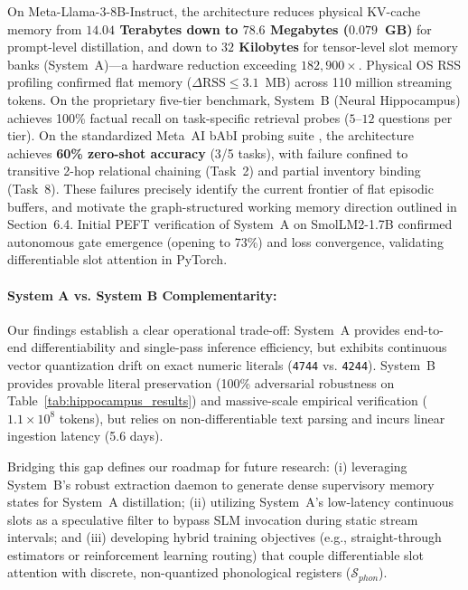 \documentclass[11pt,a4paper]{article}
\begin{document}
On Meta-Llama-3-8B-Instruct, the architecture reduces physical KV-cache memory from \textbf{$14.04$ Terabytes down to $78.6$ Megabytes ($0.079$~GB)} for prompt-level distillation, and down to \textbf{$32$ Kilobytes} for tensor-level slot memory banks (System~A)---a hardware reduction exceeding \textbf{$182,900\times$}. Physical OS RSS profiling confirmed flat memory ($\Delta\text{RSS} \le 3.1$~MB) across 110 million streaming tokens. On the proprietary five-tier benchmark, System~B (Neural Hippocampus) achieves 100\% factual recall on task-specific retrieval probes ($5$--$12$ questions per tier). On the standardized Meta~AI bAbI probing suite \cite{weston2015towards}, the architecture achieves \textbf{60\% zero-shot accuracy} (3/5 tasks), with failure confined to transitive 2-hop relational chaining (Task~2) and partial inventory binding (Task~8). These failures precisely identify the current frontier of flat episodic buffers, and motivate the graph-structured working memory direction outlined in Section~6.4. Initial PEFT verification of System~A on SmolLM2-1.7B confirmed autonomous gate emergence (opening to 73\%) and loss convergence, validating differentiable slot attention in PyTorch.

\paragraph{System A vs. System B Complementarity:}
Our findings establish a clear operational trade-off: System~A provides end-to-end differentiability and single-pass inference efficiency, but exhibits continuous vector quantization drift on exact numeric literals (\texttt{4744} vs. \texttt{4244}). System~B provides provable literal preservation (100\% adversarial robustness on Table~\ref{tab:hippocampus_results}) and massive-scale empirical verification ($1.1 \times 10^8$ tokens), but relies on non-differentiable text parsing and incurs linear ingestion latency (5.6 days). 

Bridging this gap defines our roadmap for future research: (i) leveraging System~B's robust extraction daemon to generate dense supervisory memory states for System~A distillation; (ii) utilizing System~A's low-latency continuous slots as a speculative filter to bypass SLM invocation during static stream intervals; and (iii) developing hybrid training objectives (e.g., straight-through estimators or reinforcement learning routing) that couple differentiable slot attention with discrete, non-quantized phonological registers ($\mathcal{S}_{phon}$).
\end{document}
